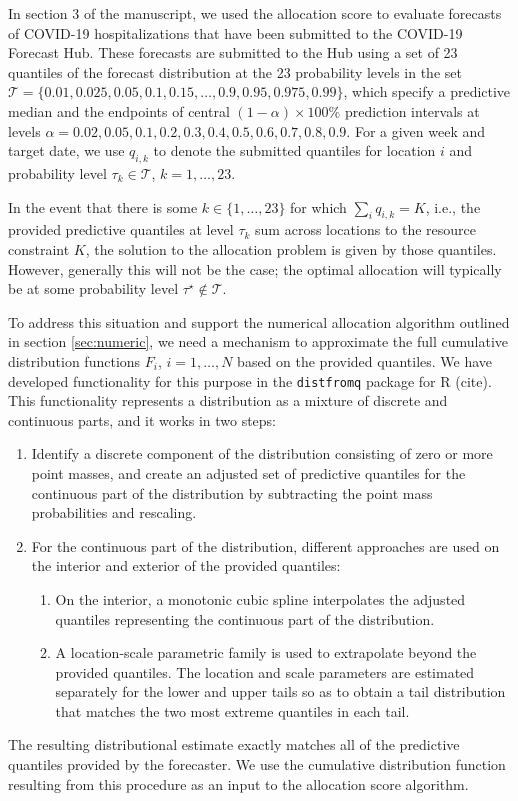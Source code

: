 \documentclass{article}
\begin{document}
In section 3 of the manuscript, we used the allocation score to evaluate forecasts of COVID-19 hospitalizations that have been submitted to the COVID-19 Forecast Hub. These forecasts are submitted to the Hub using a set of 23 quantiles of the forecast distribution at the 23 probability levels in the set $\mathcal{T} = \{0.01, 0.025, 0.05, 0.1, 0.15, \ldots, \allowbreak 0.9, 0.95, 0.975, 0.99\}$, which specify a predictive median and the endpoints of central $(1 - \alpha) \times 100\%$ prediction intervals at levels $\alpha = 0.02, 0.05, 0.1, 0.2, \allowbreak 0.3, 0.4, 0.5, 0.6, \allowbreak 0.7, 0.8, 0.9$. For a given week and target date, we use $q_{i,k}$ to denote the submitted quantiles for location $i$ and probability level $\tau_k \in \mathcal{T}$, $k = 1, \ldots, 23$.

In the event that there is some $k \in \{1, \ldots, 23\}$ for which $\sum_i q_{i,k} = K$, i.e., the provided predictive quantiles at level $\tau_k$ sum across locations to the resource constraint $K$, the solution to the allocation problem is given by those quantiles. However, generally this will not be the case; the optimal allocation will typically be at some probability level $\tau^\star \notin \mathcal{T}$.

To address this situation and support the numerical allocation algorithm outlined in section \ref{sec:numeric}, we need a mechanism to approximate the full cumulative distribution functions $F_i$, $i = 1, \ldots, N$ based on the provided quantiles. We have developed functionality for this purpose in the \verb`distfromq` package for R (cite). This functionality represents a distribution as a mixture of discrete and continuous parts, and it works in two steps:
\begin{enumerate}
  \item Identify a discrete component of the distribution consisting of zero or more point masses, and create an adjusted set of predictive quantiles for the continuous part of the distribution by subtracting the point mass probabilities and rescaling.
  \item For the continuous part of the distribution, different approaches are used on the interior and exterior of the provided quantiles:
  \begin{enumerate}
    \item On the interior, a monotonic cubic spline interpolates the adjusted quantiles representing the continuous part of the distribution.
    \item A location-scale parametric family is used to extrapolate beyond the provided quantiles. The location and scale parameters are estimated separately for the lower and upper tails so as to obtain a tail distribution that matches the two most extreme quantiles in each tail.
  \end{enumerate}
\end{enumerate}
The resulting distributional estimate exactly matches all of the predictive quantiles provided by the forecaster. We use the cumulative distribution function resulting from this procedure as an input to the allocation score algorithm.
\end{document}
